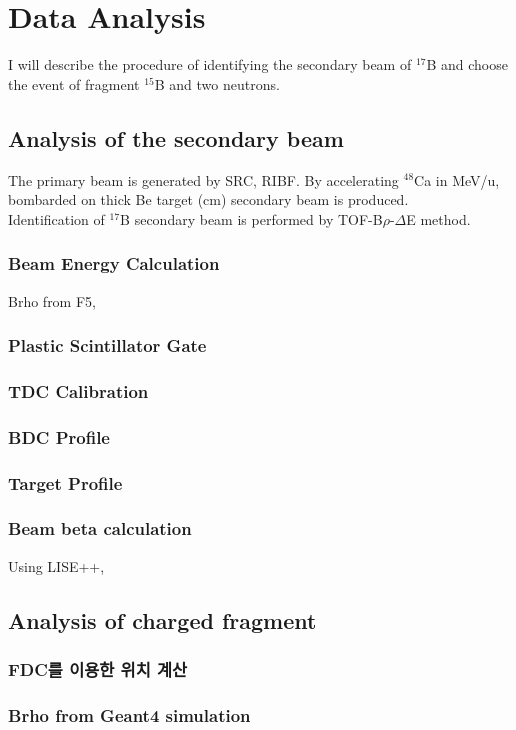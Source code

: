 \chapter{Data Analysis}
I will describe the procedure of identifying the secondary beam of ${}^{17}$B and choose the event of fragment ${}^{15}$B and two neutrons.

\section{Analysis of the secondary beam}
The primary beam is generated by SRC, RIBF. By accelerating ${}^{48}$Ca in  MeV/u, bombarded on thick Be target (cm) secondary beam is produced. \\
Identification of ${}^{17}$B secondary beam  is performed by TOF-B$\rho$-$\Delta$E method.

\subsection{Beam Energy Calculation}
Brho from F5,

\subsection{Plastic Scintillator Gate}

\subsection{TDC Calibration}
\subsection{BDC Profile}
\subsection{Target Profile}
\subsection{Beam beta calculation}
Using LISE++, 

\section{Analysis of charged fragment}
\subsection{FDC를 이용한 위치 계산}
\subsection{Brho from Geant4 simulation}
